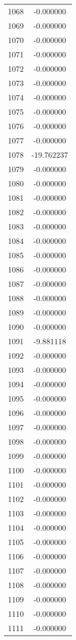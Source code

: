 \documentclass[12pt]{article}
\begin{document}
\begin{longtable}{@{}cc@{}}
1068 & -0.000000 \\
1069 & -0.000000 \\
1070 & -0.000000 \\
1071 & -0.000000 \\
1072 & -0.000000 \\
1073 & -0.000000 \\
1074 & -0.000000 \\
1075 & -0.000000 \\
1076 & -0.000000 \\
1077 & -0.000000 \\
1078 & -19.762237 \\
1079 & -0.000000 \\
1080 & -0.000000 \\
1081 & -0.000000 \\
1082 & -0.000000 \\
1083 & -0.000000 \\
1084 & -0.000000 \\
1085 & -0.000000 \\
1086 & -0.000000 \\
1087 & -0.000000 \\
1088 & -0.000000 \\
1089 & -0.000000 \\
1090 & -0.000000 \\
1091 & -9.881118 \\
1092 & -0.000000 \\
1093 & -0.000000 \\
1094 & -0.000000 \\
1095 & -0.000000 \\
1096 & -0.000000 \\
1097 & -0.000000 \\
1098 & -0.000000 \\
1099 & -0.000000 \\
1100 & -0.000000 \\
1101 & -0.000000 \\
1102 & -0.000000 \\
1103 & -0.000000 \\
1104 & -0.000000 \\
1105 & -0.000000 \\
1106 & -0.000000 \\
1107 & -0.000000 \\
1108 & -0.000000 \\
1109 & -0.000000 \\
1110 & -0.000000 \\
1111 & -0.000000 \\

\end{longtable}
\end{document}
